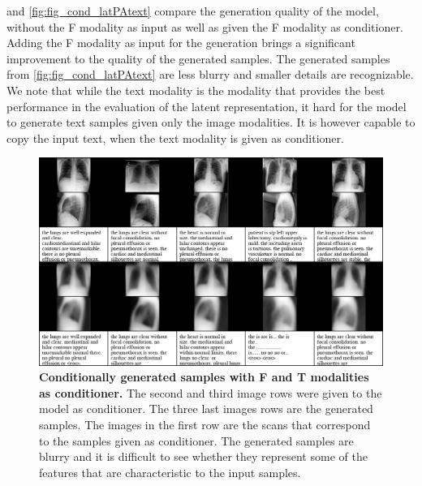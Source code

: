 \documentclass{midl} %
\begin{document}
     and \cref{fig:fig_cond_latPAtext} compare the generation quality of the model, without the F modality as input as well as given the F modality as conditioner.
    Adding the F modality as input for the generation brings a significant improvement to the quality of the generated samples.
    The generated samples from \cref{fig:fig_cond_latPAtext} are less blurry and smaller details are recognizable.
    We note that while the text modality is the modality that provides the best performance in the evaluation of the latent representation, it hard for the model to generate text samples given only the image modalities.
    It is however capable to copy the input text, when the text modality is given as conditioner.
    
    
    \begin{figure}
        \centering
        \includegraphics[width=\textwidth]{data/cond_gen/Lateral_text}
        \caption{
            \textbf{Conditionally generated samples with F and T modalities as conditioner.} The second and third image rows were given to the model as conditioner. The three last images rows are the generated samples. The images in the first row are the scans that correspond to the samples given as conditioner. The generated samples are blurry and it is difficult to see whether they represent some of the features that are characteristic to the input samples.
        }
        \label{fig:fig_cond_lattext}
    \end{figure}
    
\end{document}

